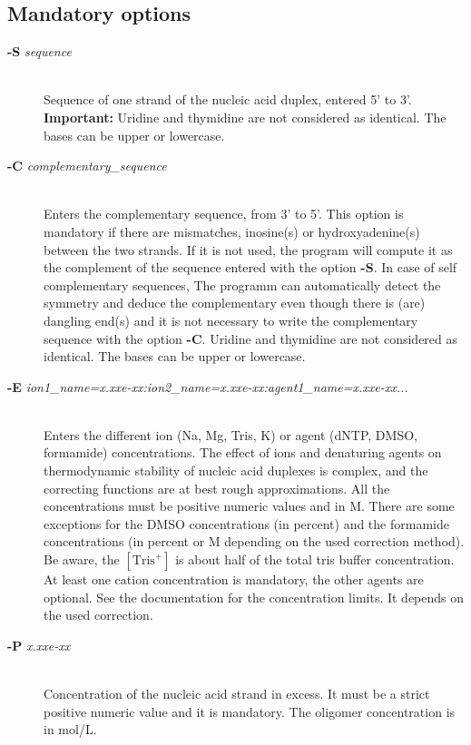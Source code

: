 \documentclass{article}
\begin{document}
\subsection{Mandatory options}
\begin{description}

\item [\textbf{-S} \textit{sequence}  ]\mbox{}\\ 
  Sequence of one strand of the nucleic 
  acid duplex, entered 5' to 3'. \textbf{Important:} 
  Uridine and thymidine are not considered as identical. The bases can be upper or lowercase.
\item [\textbf{-C} \textit{complementary\_sequence}] \mbox{}\\
  Enters the complementary sequence, from 3' to 5'. This option is mandatory if
  there are mismatches, inosine(s) or hydroxyadenine(s) between the two strands. If it is not used, the program
  will compute it as the complement of the sequence entered with the option \textbf{-S}. In case of self complementary sequences,
  The programm can automatically detect the symmetry and deduce the complementary even though there is (are) dangling
  end(s) and it is not necessary to write the complementary sequence with the option \textbf{-C}.
  Uridine and thymidine are not considered as identical. The bases can be upper or lowercase.
\item [\textbf{-E} \textit{ion1\_name=x.xxe-xx:ion2\_name=x.xxe-xx:agent1\_name=x.xxe-xx...}] \mbox{}\\
  Enters the different ion (Na, Mg, Tris, K) or agent (dNTP, DMSO, formamide) concentrations. The effect  
  of  ions and denaturing agents on  thermodynamic  stability  of nucleic  acid duplexes is complex,
  and the correcting functions are  at  best rough  approximations. All the concentrations must be positive numeric
  values and in M. There are some exceptions for the DMSO concentrations (in
  percent) and the formamide concentrations
  (in percent or M depending on the used correction method). Be aware, the $[\mbox{Tris}^+]$ is about half of the total tris buffer
  concentration.
  At least one cation concentration is mandatory, the other agents are optional. See the documentation for the concentration 
  limits. It depends on the used correction.
\item [\textbf{-P} \textit{x.xxe-xx}]\mbox{}\\ 
  Concentration of the nucleic acid strand in excess. It must be a strict positive numeric value and it is mandatory. The oligomer
  concentration is in mol/L.

\end{description}
\end{document}
